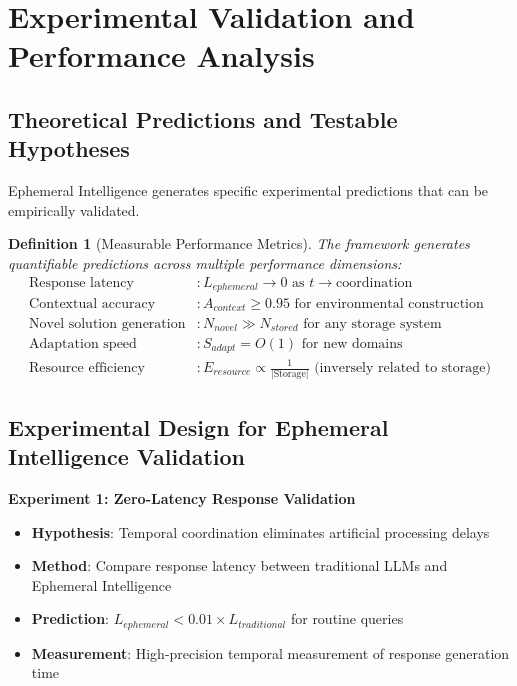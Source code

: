 \documentclass[12pt,a4paper]{article}
\newtheorem{definition}{Definition}
\begin{document}
\section{Experimental Validation and Performance Analysis}

\subsection{Theoretical Predictions and Testable Hypotheses}

Ephemeral Intelligence generates specific experimental predictions that can be empirically validated.

\begin{definition}[Measurable Performance Metrics]
The framework generates quantifiable predictions across multiple performance dimensions:
\begin{align}
\text{Response latency} &: L_{ephemeral} \to 0 \text{ as } t \to \text{coordination} \\
\text{Contextual accuracy} &: A_{context} \geq 0.95 \text{ for environmental construction} \\
\text{Novel solution generation} &: N_{novel} \gg N_{stored} \text{ for any storage system} \\
\text{Adaptation speed} &: S_{adapt} = O(1) \text{ for new domains} \\
\text{Resource efficiency} &: E_{resource} \propto \frac{1}{|\text{Storage}|} \text{ (inversely related to storage)}
\end{align}
\end{definition}

\subsection{Experimental Design for Ephemeral Intelligence Validation}

\textbf{Experiment 1: Zero-Latency Response Validation}
\begin{itemize}
\item \textbf{Hypothesis}: Temporal coordination eliminates artificial processing delays
\item \textbf{Method}: Compare response latency between traditional LLMs and Ephemeral Intelligence
\item \textbf{Prediction}: $L_{ephemeral} < 0.01 \times L_{traditional}$ for routine queries
\item \textbf{Measurement}: High-precision temporal measurement of response generation time
\end{itemize}
\end{document}
